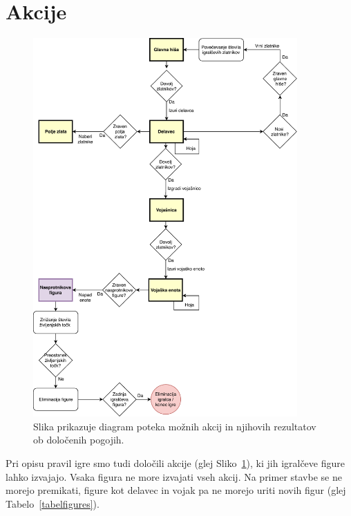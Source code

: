 \documentclass[a4paper, 12pt]{book}
\begin{document}
{\section{Akcije}

\begin{figure}[h!]
	\begin{center}
		\includegraphics[width=0.9\textwidth]{photos/prikazAkcij.pdf}
	\end{center}
	\caption{Slika prikazuje diagram poteka možnih akcij in njihovih rezultatov ob določenih pogojih.}
	\label{picActions}
\end{figure}

Pri opisu pravil igre smo tudi določili akcije (glej Sliko~\ref{picActions}), ki jih igralčeve figure lahko izvajajo. 
Vsaka figura ne more izvajati vseh akcij. 
Na primer stavbe se ne morejo premikati, figure kot delavec in vojak pa ne morejo uriti novih figur (glej Tabelo~\ref{tabelfigures}).

}
\end{document}
